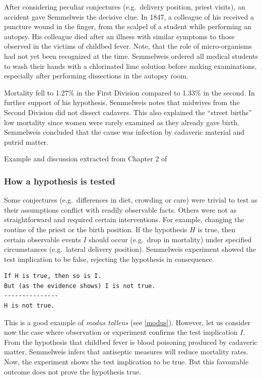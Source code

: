 \documentclass[
]{book}
\newenvironment{rnote}{\par\raggedleft}{\par}
\begin{document}
After considering peculiar conjectures (e.g.~delivery position, priest visits), an accident gave Semmelweis the decisive clue. In 1847, a colleague of his received a puncture wound in the finger, from the scalpel of a student while performing an autopsy. His colleague died after an illness with similar symptoms to those observed in the victims of childbed fever. Note, that the role of micro-organisms had not yet been recognized at the time. Semmelweis ordered all medical students to wash their hands with a chlorinated lime solution before making examinations, especially after performing dissections in the autopsy room.

Mortality fell to 1.27\% in the First Division compared to 1.33\% in the second. In further support of his hypothesis, Semmelweis notes that midwives from the Second Division did not dissect cadavers. This also explained the ``street births'' low mortality since women were rarely examined as they already gave birth. Semmelweis concluded that the cause was infection by cadaveric material and putrid matter.

\begin{rnote}
Example and discussion extracted from Chapter 2 of \citep{hempel-pos}

\end{rnote}

\hypertarget{how-a-hypothesis-is-tested}{%
\subsubsection{How a hypothesis is tested}\label{how-a-hypothesis-is-tested}}

Some conjectures (e.g.~differences in diet, crowding or care) were trivial to test as their assumptions conflict with readily observable facts. Others were not as straightforward and required certain interventions. For example, changing the routine of the priest or the birth position. If the hypothesis \(H\) is true, then certain observable events \(I\) should occur (e.g.~drop in mortality) under specified circumstances (e.g.~lateral delivery position). Semmelweis experiment showed the test implication to be false, rejecting the hypothesis in consequence.

\begin{verbatim}
If H is true, then so is I.
But (as the evidence shows) I is not true.
---------------
H is not true.
\end{verbatim}

This is a good example of \emph{modus tollens} (see \ref{modus}). However, let us consider now the case where observation or experiment confirms the test implication \(I\). From the hypothesis that childbed fever is blood poisoning produced by cadaveric matter, Semmelweis infers that antiseptic measures will reduce mortality rates. Now, the experiment shows the test implication to be true. But this favourable outcome does not prove the hypothesis true.
\end{document}
